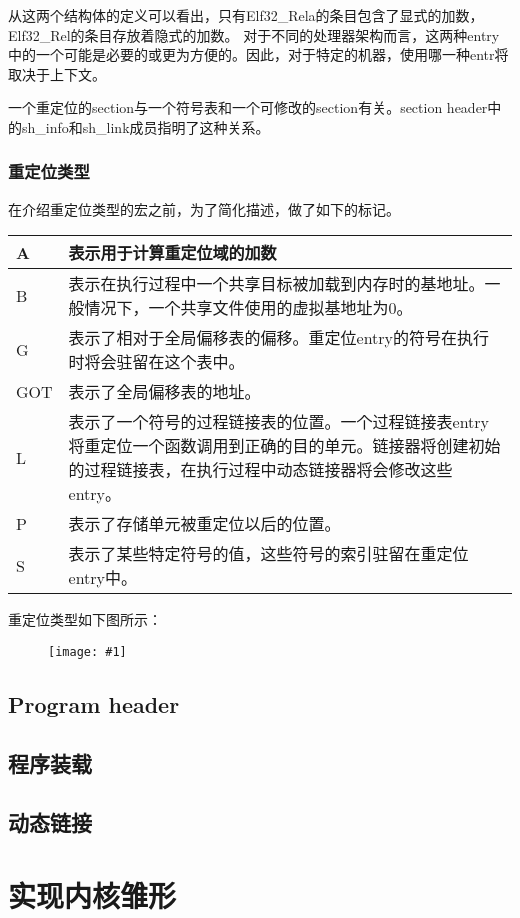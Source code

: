 \documentclass[a4paper,left=2.5cm,right=2.5cm,11pt]{article}
\newcommand{\fic}[1]{\begin{figure}[H]
		\center
		\texttt{[image: \#1]}
	\end{figure}}
\newcommand{\interval}{\vspace{0.5em}}
\begin{document}
	从这两个结构体的定义可以看出，只有Elf32\_Rela的条目包含了显式的加数，Elf32\_Rel的条目存放着隐式的加数。
	对于不同的处理器架构而言，这两种entry中的一个可能是必要的或更为方便的。因此，对于特定的机器，使用哪一种entr将取决于上下文。\par

	一个重定位的section与一个符号表和一个可修改的section有关。section header中的sh\_info和sh\_link成员指明了这种关系。

\subsubsection{重定位类型}
	在介绍重定位类型的宏之前，为了简化描述，做了如下的标记。

	\interval
	\begin{longtable}{p{2cm}p{9cm}}
	\hline
	A & 表示用于计算重定位域的加数 \\
	\hline
	B & 表示在执行过程中一个共享目标被加载到内存时的基地址。一般情况下，一个共享文件使用的虚拟基地址为0。\\
	\hline
	G & 表示了相对于全局偏移表的偏移。重定位entry的符号在执行时将会驻留在这个表中。\\
	\hline
	GOT & 表示了全局偏移表的地址。\\
	\hline
	L & 表示了一个符号的过程链接表的位置。一个过程链接表entry将重定位一个函数调用到正确的目的单元。链接器将创建初始的过程链接表，在执行过程中动态链接器将会修改这些entry。\\
	\hline
	P & 表示了存储单元被重定位以后的位置。\\
	\hline
	S & 表示了某些特定符号的值，这些符号的索引驻留在重定位entry中。\\
	\hline
	\end{longtable}
	\interval

	重定位类型如下图所示：
	\fic{20.png}


\subsection{Program header}
\subsection{程序装载}
\subsection{动态链接}

\clearpage

\section{实现内核雏形}
\end{document}
